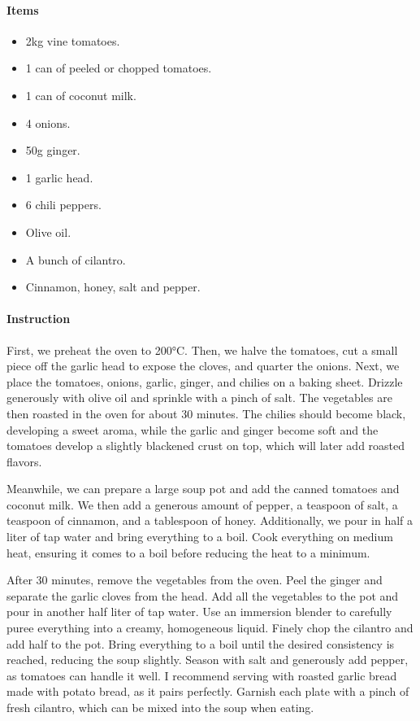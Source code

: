 \paragraph{Items}
\begin{itemize}[noitemsep]
	\item[\ding{182}] 2kg vine tomatoes.
	\item[\ding{183}] 1 can of peeled or chopped tomatoes.
	\item[\ding{184}] 1 can of coconut milk.
	\item[\ding{185}] 4 onions.
	\item[\ding{186}] 50g ginger.
	\item[\ding{187}] 1 garlic head.
	\item[\ding{188}] 6 chili peppers.
	\item[\ding{189}] Olive oil.
	\item[\ding{190}] A bunch of cilantro.
	\item[\ding{191}] Cinnamon, honey, salt and pepper.
\end{itemize}

\paragraph{Instruction} First, we preheat the oven to 200°C. Then, we halve the tomatoes, cut a small piece off the garlic head to expose the cloves, and quarter the onions. Next, we place the tomatoes, onions, garlic, ginger, and chilies on a baking sheet. Drizzle generously with olive oil and sprinkle with a pinch of salt. The vegetables are then roasted in the oven for about 30 minutes. The chilies should become black, developing a sweet aroma, while the garlic and ginger become soft and the tomatoes develop a slightly blackened crust on top, which will later add roasted flavors.

Meanwhile, we can prepare a large soup pot and add the canned tomatoes and coconut milk. We then add a generous amount of pepper, a teaspoon of salt, a teaspoon of cinnamon, and a tablespoon of honey. Additionally, we pour in half a liter of tap water and bring everything to a boil. Cook everything on medium heat, ensuring it comes to a boil before reducing the heat to a minimum.

After 30 minutes, remove the vegetables from the oven. Peel the ginger and separate the garlic cloves from the head. Add all the vegetables to the pot and pour in another half liter of tap water. Use an immersion blender to carefully puree everything into a creamy, homogeneous liquid. Finely chop the cilantro and add half to the pot. Bring everything to a boil until the desired consistency is reached, reducing the soup slightly. Season with salt and generously add pepper, as tomatoes can handle it well. I recommend serving with roasted garlic bread made with potato bread, as it pairs perfectly. Garnish each plate with a pinch of fresh cilantro, which can be mixed into the soup when eating.